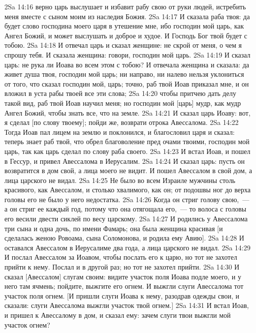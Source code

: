 \vs 2Sa 14:16 верно царь выслушает и избавит рабу свою от руки людей,  истребить меня вместе с сыном моим из наследия Божия.
\vs 2Sa 14:17 И сказала раба твоя: да будет слово господина моего царя в утешение мне, ибо господин мой царь, как Ангел Божий, и может выслушать и доброе и худое. И Господь Бог твой будет с тобою.
\vs 2Sa 14:18 И отвечал царь и сказал женщине: не скрой от меня, о чем я спрошу тебя. И сказала женщина: говори, господин мой царь.
\vs 2Sa 14:19 И сказал царь: не рука ли Иоава во всем этом с тобою? И отвечала женщина и сказала: да живет душа твоя, господин мой царь; ни направо, ни налево нельзя уклониться от того, что сказал господин мой, царь; точно, раб твой Иоав приказал мне, и он вложил в уста рабы твоей все эти слова;
\vs 2Sa 14:20 чтобы притчею дать делу такой вид, раб твой Иоав научил меня; но господин мой [царь] мудр, как мудр Ангел Божий, чтобы знать все, что на земле.
\vs 2Sa 14:21 И сказал царь Иоаву: вот, я сделал [по слову твоему]; пойди же, возврати отрока Авессалома.
\vs 2Sa 14:22 Тогда Иоав пал лицем на землю и поклонился, и благословил царя и сказал: теперь знает раб твой, что обрел благоволение пред очами твоими, господин мой царь, так как царь сделал по слову раба своего.
\vs 2Sa 14:23 И встал Иоав, и пошел в Гессур, и привел Авессалома в Иерусалим.
\vs 2Sa 14:24 И сказал царь: пусть он возвратится в дом свой, а лица моего не видит. И пошел Авессалом в свой дом, а лица царского не видал.
\rsbpar\vs 2Sa 14:25 Не было во всем Израиле мужчины столь красивого, как Авессалом, и столько хвалимого, как он; от подошвы ног до верха головы его не было у него недостатка.
\vs 2Sa 14:26 Когда он стриг голову свою,~--- а он стриг ее каждый год, потому что она отягощала его,~--- то волоса с головы его весили двести сиклей по весу царскому.
\vs 2Sa 14:27 И родились у Авессалома три сына и одна дочь, по имени Фамарь; она была женщина красивая [и сделалась женою Ровоама, сына Соломонова, и родила ему Авию].
\vs 2Sa 14:28 И оставался Авессалом в Иерусалиме два года, а лица царского не видал.
\vs 2Sa 14:29 И послал Авессалом за Иоавом, чтобы послать его к царю, но тот не захотел прийти к нему. Послал и в другой раз; но тот не захотел прийти.
\vs 2Sa 14:30 И сказал [Авессалом] слугам своим: видите участок поля Иоава подле моего, и у него там ячмень; пойдите, выжгите его огнем. И выжгли слуги Авессалома тот участок поля огнем. [И пришли слуги Иоава к нему, разодрав одежды свои, и сказали: слуги Авессалома выжгли участок твой огнем.]
\vs 2Sa 14:31 И встал Иоав, и пришел к Авессалому в дом, и сказал ему: зачем слуги твои выжгли мой участок огнем?

